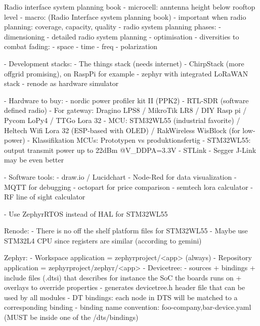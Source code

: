 Radio interface system planning book
- microcell: anntenna height below rooftop level
- macro: (Radio Interface system planning book)
- important when radio planning: coverage, capacity, quality
- radio system planning phases:
  - dimensioning
  - detailed radio system planning 
  - optimisation
- diversities to combat fading:
  - space
  - time 
  - freq
  - polarization 

- Development stacks:
  - The things stack (needs internet)
  - ChirpStack (more offgrid promising), on RaspPi for example
  - zephyr with integrated LoRaWAN stack 
  - renode as hardware simulator
  
- Hardware to buy:
  - nordic power profiler kit II (PPK2)
  - RTL-SDR (software defined radio)
  - For gateway: Dragino LPS8 / MikroTik LR8 / DIY Rasp pi / Pycom LoPy4 / TTGo Lora 32
  - MCU: STM32WL55 (industrial favorite) / Heltech Wifi Lora 32 (ESP-based with OLED) / RakWireless WisBlock (for low-power)
  - Klassifikation MCUs: Prototypen vs produktionsfertig
  - STM32WL55: output transmit power up to 22dBm @V_DDPA=3.3V
  - STLink
  - Segger J-Link may be even better

- Software tools:
  - draw.io / Lucidchart
  - Node-Red for data visualization
  - MQTT for debugging
  - octopart for price comparison
  - semtech lora calculator
  - RF line of sight calculator

- Use ZephyrRTOS instead of HAL for STM32WL55

Renode:
- There is no off the shelf platform files for STM32WL55 
- Maybe use STM32L4 CPU since registers are similar (according to gemini)

Zephyr:
- Workspace application = zephyrproject/<app> (always)
- Repository application = zephyrproject/zephyr/<app>
- Devicetree:
  - sources + bindings + include files (.dtsi) that describes for instance the SoC the boards runs on + overlays to override properties
  - generates devicetree.h header file that can be used by all modules 
  - DT bindings: each node in DTS will be matched to a corresponding binding
  - binding name convention: foo-company,bar-device.yaml (MUST be inside one of the /dts/bindings)

